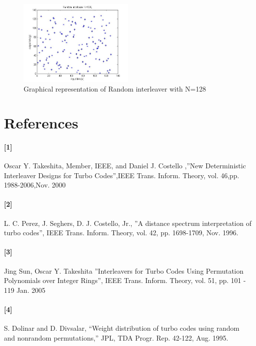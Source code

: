 \documentclass[20 pts]{article}
\begin{document}
\begin{figure}[!]
\centering
\includegraphics[width=0.5\textwidth,keepaspectratio]{zemi2fig4.jpg}
\caption{Graphical representation of Random interleaver with N=128}
\label{}
\end{figure}




\newpage
\section{References}
\paragraph{[1]}  Oscar Y. Takeshita, Member, IEEE, and Daniel J. Costello ,''New Deterministic Interleaver Designs for Turbo Codes'',IEEE Trans. Inform. Theory, vol.  46,pp. 1988-2006,Nov. 2000\\
\paragraph{[2]}  L. C. Perez, J. Seghers, D. J. Costello, Jr., ''A distance spectrum interpretation of turbo codes'', IEEE Trans. Inform. Theory, vol. 42, pp. 1698-1709, Nov. 1996.\\
\paragraph{[3]} Jing Sun, Oscar Y. Takeshita ”Interleavers for Turbo Codes Using Permutation Polynomials over Integer Rings”, IEEE Trans. Inform. Theory, vol. 51,
pp. 101 - 119 Jan. 2005\\
\paragraph{[4]}S. Dolinar and D. Divsalar, “Weight distribution of turbo codes using
random and nonrandom permutations,” JPL, TDA Progr. Rep. 42-122,
Aug. 1995.
\end{document}
